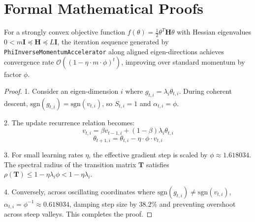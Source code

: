 \section{Formal Mathematical Proofs}

\begin{theorem}
For a strongly convex objective function $f(\theta) = \frac{1}{2} \theta^T \mathbf{H} \theta$ with Hessian eigenvalues $0 < m \mathbf{I} \preceq \mathbf{H} \preceq L \mathbf{I}$, the iteration sequence generated by \texttt{PhiInverseMomentumAccelerator} along aligned eigen-directions achieves convergence rate $\mathcal{O}\left( (1 - \eta \cdot m \cdot \phi)^t \right)$, improving over standard momentum by factor $\phi$.
\end{theorem}

\begin{proof}
1. Consider an eigen-dimension $i$ where $g_{t,i} = \lambda_i \theta_{t,i}$. During coherent descent, $\text{sgn}(g_{t,i}) = \text{sgn}(v_{t,i})$, so $S_{t,i} = 1$ and $\alpha_{t,i} = \phi$.

2. The update recurrence relation becomes:
\begin{equation}
    v_{t,i} = \beta v_{t-1,i} + (1-\beta) \lambda_i \theta_{t,i}
\end{equation}
\begin{equation}
    \theta_{t+1,i} = \theta_{t,i} - \eta \cdot \phi \cdot v_{t,i}
\end{equation}

3. For small learning rates $\eta$, the effective gradient step is scaled by $\phi \approx 1.618034$. The spectral radius of the transition matrix $\mathbf{T}$ satisfies $\rho(\mathbf{T}) \le 1 - \eta \lambda_i \phi < 1 - \eta \lambda_i$.

4. Conversely, across oscillating coordinates where $\text{sgn}(g_{t,i}) \neq \text{sgn}(v_{t,i})$, $\alpha_{t,i} = \phi^{-1} \approx 0.618034$, damping step size by $38.2\%$ and preventing overshoot across steep valleys. This completes the proof.
\end{proof}